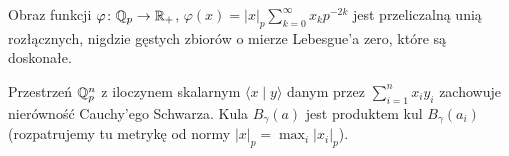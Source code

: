 Obraz funkcji $\varphi \colon \mathbb Q_p \to \mathbb R_+$, $\varphi(x) = |x|_p \sum_{k = 0}^\infty x_k p^{-2k}$ jest przeliczalną unią rozłącznych, nigdzie gęstych zbiorów o mierze Lebesgue'a zero, które są doskonałe.

Przestrzeń $\mathbb Q_p^n$ z iloczynem skalarnym $\langle x \mid y \rangle$ danym przez $\sum_{i=1}^n x_i y_i$ zachowuje nierówność Cauchy'ego Schwarza.
Kula $B_\gamma(a)$ jest produktem kul $B_\gamma(a_i)$ (rozpatrujemy tu metrykę od normy $|x|_p = \max_i |x_i|_p$).